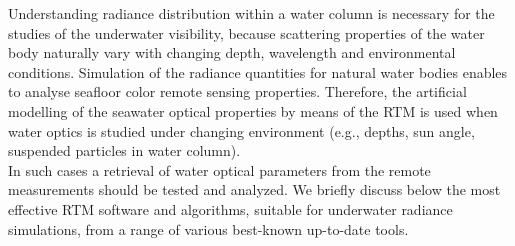 \documentclass[11pt]{article}
\begin{document}
Understanding radiance distribution within a water column is necessary for the studies of the underwater visibility, because scattering properties of the water body naturally vary with changing depth, wavelength and environmental conditions.  Simulation of the radiance quantities for natural water bodies enables to analyse seafloor color remote sensing properties. Therefore, the artificial modelling of the seawater optical properties by means of the \ac{RTM} is used when water optics is studied under changing environment (e.g., depths, sun angle, suspended particles in water column). \\ In such cases a retrieval of water optical parameters from the remote measurements should be tested and analyzed. 
\newline
We briefly discuss below the most effective RTM software and algorithms, suitable for underwater radiance simulations, from a range of various best-known up-to-date tools. 
\end{document}
